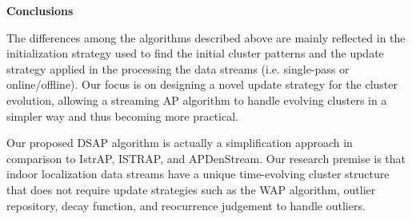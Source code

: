 









\textbf{Conclusions}

The differences among the algorithms described above are mainly reflected in the initialization strategy used to find the initial cluster patterns and the update strategy applied in the processing the data streams (i.e. single-pass or online/offline). Our focus is on designing a novel update strategy for the cluster evolution, allowing a streaming AP algorithm to handle evolving clusters in a simpler way and thus becoming more practical. 

Our proposed DSAP algorithm is actually a simplification approach in comparison to IstrAP, ISTRAP, and APDenStream. Our research premise is that indoor localization data streams have a unique time-evolving cluster structure that does not require update strategies such as the WAP algorithm, outlier repository, decay function, and reocurrence judgement to handle outliers. 

